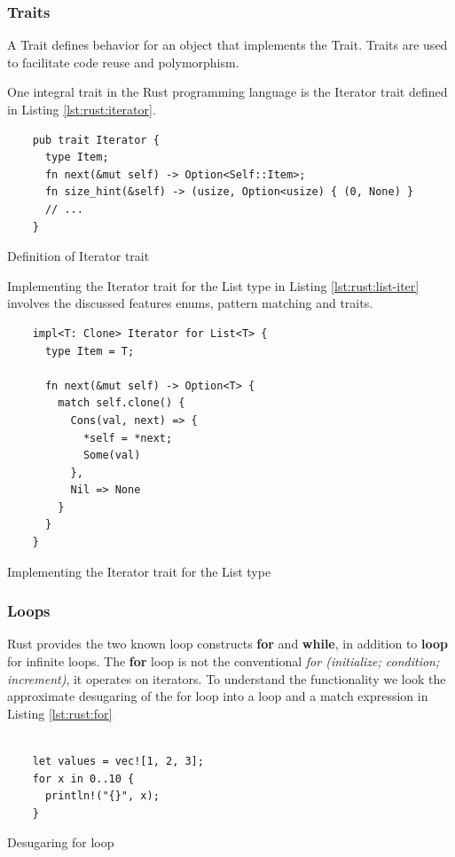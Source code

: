 \subsubsection{Traits}

A Trait defines behavior for an object that implements the Trait.
Traits are used to facilitate code reuse and polymorphism.

One integral trait in the Rust programming language is the Iterator trait defined in Listing \ref{lst:rust:iterator}.

\begin{listing}[H]
  \begin{verbatim}
    pub trait Iterator {
      type Item;
      fn next(&mut self) -> Option<Self::Item>;
      fn size_hint(&self) -> (usize, Option<usize) { (0, None) }
      // ...
    }
  \end{verbatim}
  \caption{Definition of Iterator trait}
  \label{lst:rust:iterator}
\end{listing}

Implementing the Iterator trait for the List type in Listing \ref{lst:rust:list-iter} involves the discussed features enums, pattern matching and traits.

\begin{listing}[H]
  \begin{verbatim}
    impl<T: Clone> Iterator for List<T> {
      type Item = T;

      fn next(&mut self) -> Option<T> {
        match self.clone() {
          Cons(val, next) => {
            *self = *next;
            Some(val)
          },
          Nil => None
        }
      }
    }
  \end{verbatim}
  \caption{Implementing the Iterator trait for the List type}
  \label{lst:rust:list-iter}
\end{listing}


\subsubsection{Loops}

Rust provides the two known loop constructs \textbf{for} and \textbf{while}, in addition to \textbf{loop} for infinite loops.
The \textbf{for} loop is not the conventional \textit{for (initialize; condition; increment)}, it operates on iterators.
To understand the functionality we look the approximate desugaring of the for loop into a loop and a match expression in Listing \ref{lst:rust:for}


\begin{minipage}[b]{0.5\linewidth}
  \begin{listing}[H]
  \begin{verbatim}

    let values = vec![1, 2, 3];
    for x in 0..10 {
      println!("{}", x);
    }

  \end{verbatim}
  \caption{Desugaring for loop}
  \label{lst:rust:for}
  \end{listing}
  \end{minipage}

